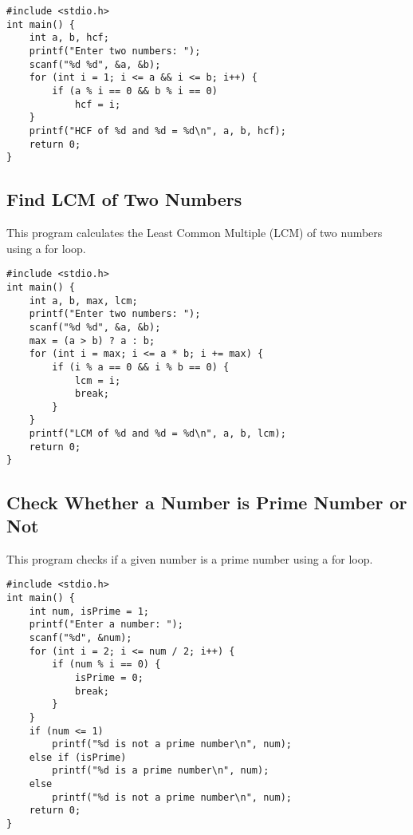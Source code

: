 \documentclass[a4paper,12pt]{article}
\begin{document}
\begin{lstlisting}[caption={Find HCF (GCD) of Two Numbers}]
#include <stdio.h>
int main() {
    int a, b, hcf;
    printf("Enter two numbers: ");
    scanf("%d %d", &a, &b);
    for (int i = 1; i <= a && i <= b; i++) {
        if (a % i == 0 && b % i == 0)
            hcf = i;
    }
    printf("HCF of %d and %d = %d\n", a, b, hcf);
    return 0;
}
\end{lstlisting}

\newpage

\subsection{Find LCM of Two Numbers}
This program calculates the Least Common Multiple (LCM) of two numbers using a for loop.

\begin{lstlisting}[caption={Find LCM of Two Numbers}]
#include <stdio.h>
int main() {
    int a, b, max, lcm;
    printf("Enter two numbers: ");
    scanf("%d %d", &a, &b);
    max = (a > b) ? a : b;
    for (int i = max; i <= a * b; i += max) {
        if (i % a == 0 && i % b == 0) {
            lcm = i;
            break;
        }
    }
    printf("LCM of %d and %d = %d\n", a, b, lcm);
    return 0;
}
\end{lstlisting}

\newpage

\subsection{Check Whether a Number is Prime Number or Not}
This program checks if a given number is a prime number using a for loop.

\begin{lstlisting}[caption={Check Whether a Number is Prime Number or Not}]
#include <stdio.h>
int main() {
    int num, isPrime = 1;
    printf("Enter a number: ");
    scanf("%d", &num);
    for (int i = 2; i <= num / 2; i++) {
        if (num % i == 0) {
            isPrime = 0;
            break;
        }
    }
    if (num <= 1)
        printf("%d is not a prime number\n", num);
    else if (isPrime)
        printf("%d is a prime number\n", num);
    else
        printf("%d is not a prime number\n", num);
    return 0;
}
\end{lstlisting}

\newpage

\end{document}

